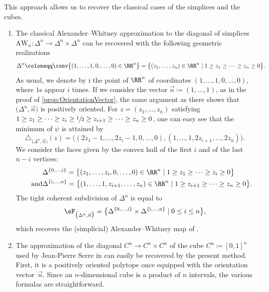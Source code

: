 \begin{example} This approach allows us to recover the classical cases of the simplices and the cubes.
\begin{enumerate}
\item The classical Alexander--Whitney approximation to the diagonal of simplices $\mathrm{AW}_n : \Delta^n \to \Delta^n\times \Delta^n$ can be recovered with the following geometric realizations
\[\Delta^n\coloneqq\conv\big\{(1, \ldots, 1, 0,\ldots, 0)\in \RR^n\big\}=
\big\{(z_1, \ldots, z_n)\in \RR^n\mid
1 \geq z_1\geq \cdots \geq z_n \geq 0
\big\}.
\]
As usual, we denote by $\mathrm{i}$ the point of $\RR^n$ of coordinates $(1, \ldots, 1, 0,\ldots, 0)$,
where $1$s appear $i$ times. If we consider the vector $\vec n\coloneqq (1, \ldots, 1)$, as in the proof of \cref{prop:OrientationVector}, the same argument as there shows that $\big(\Delta^n, \vec n \big)$ is
positively oriented.
For $z=(z_1, \ldots, z_n)$ satisfying
$1 \geq z_1\geq \cdots \geq z_i \geq \sfrac{1}{2} \geq z_{i+1}\geq \cdots \geq z_n \geq 0$,
one can easy see that the minimum of $\psi$ is attained by
\[
\triangle_{\big(\Delta^n, \vec n\big)}(z)=
\big((
2z_1-1, \ldots, 2z_i-1, 0, \ldots, 0),
(
1, \ldots, 1,
2z_{i+1}, \ldots, 2z_n
)\big).
\]
We consider the faces given by the convex hull of the first $i$ and of the last $n-i$ vertices:
\begin{align*}
&\Delta^{\{\mathrm{0}, \ldots, \mathrm{i} \}}=
\big\{(z_1, \ldots, z_i, 0, \ldots, 0)\in \RR^n\mid
1 \geq z_1\geq \cdots \geq z_i \geq 0
\big\}\\
\tag*{and}&
\Delta^{\{\mathrm{i}, \ldots, \mathrm{n} \}}=
\big\{(1, \ldots, 1, z_{i+1}, \ldots, z_n)\in \RR^n\mid
1 \geq z_{i+1}\geq \cdots \geq z_n \geq 0
\big\}.
\end{align*}
The tight coherent subdivision of $\Delta^n$ is
equal to
\[\sF_{\big(\Delta^n, \vec n\big)}=
\bigl\{\Delta^{\{\mathrm{0}, \ldots, \mathrm{i} \}} \times \Delta^{\{\mathrm{i}, \ldots, \mathrm{n} \}} \mid
0 \leq i \leq n
\bigr\},
\]
which recovers the (simplicial) Alexander--Whitney map of \cite{EilenbergZilber53, EilenbergMacLane54}.

\item The approximation of the diagonal $C^n \to C^n\times C^n$ of the cube $C^n\coloneqq [0,1]^n$ used by Jean-Pierre Serre in \cite{Serre51} can easily be recovered by the present method. First, it is a positively oriented polytope once equipped with the orientation vector~$\vec n$. Since an $n$-dimensional cube is a product of $n$ intervals, the various formulas are straightforward.
\end{enumerate}
\end{example}

